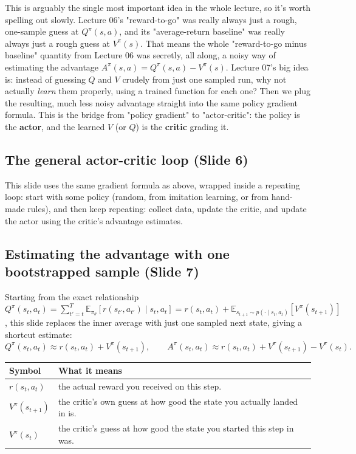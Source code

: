\documentclass[11pt]{article}
\begin{document}
This is arguably the single most important idea in the whole lecture, so it's worth spelling out slowly. Lecture 06's "reward-to-go" was really always just a rough, one-sample guess at $Q^\pi(s,a)$, and its "average-return baseline" was really always just a rough guess at $V^\pi(s)$. That means the whole "reward-to-go minus baseline" quantity from Lecture 06 was secretly, all along, a noisy way of estimating the advantage $A^\pi(s,a) = Q^\pi(s,a) - V^\pi(s)$. Lecture 07's big idea is: instead of guessing $Q$ and $V$ crudely from just one sampled run, why not actually \emph{learn} them properly, using a trained function for each one? Then we plug the resulting, much less noisy advantage straight into the same policy gradient formula. This is the bridge from "policy gradient" to "actor-critic": the policy is the \textbf{actor}, and the learned $V$ (or $Q$) is the \textbf{critic} grading it.

\subsection{The general actor-critic loop (Slide 6)}
This slide uses the same gradient formula as above, wrapped inside a repeating loop: start with some policy (random, from imitation learning, or from hand-made rules), and then keep repeating: collect data, update the critic, and update the actor using the critic's advantage estimates.

\subsection{Estimating the advantage with one bootstrapped sample (Slide 7)}
Starting from the exact relationship $Q^\pi(s_t,a_t) = \sum_{t'=t}^T \mathbb{E}_{\pi_\theta}[r(s_{t'},a_{t'})\mid s_t,a_t] = r(s_t,a_t) + \mathbb{E}_{s_{t+1}\sim p(\cdot\mid s_t,a_t)}[V^\pi(s_{t+1})]$, this slide replaces the inner average with just one sampled next state, giving a shortcut estimate:
$$Q^\pi(s_t,a_t) \approx r(s_t,a_t) + V^\pi(s_{t+1}), \qquad A^\pi(s_t,a_t) \approx r(s_t,a_t) + V^\pi(s_{t+1}) - V^\pi(s_t).$$
\begin{center}
\begin{tabular}{@{} >{\raggedright\arraybackslash}p{} >{\raggedright\arraybackslash}p{} @{}}
\toprule
\textbf{Symbol} & \textbf{What it means} \\
\midrule
$r(s_t,a_t)$ & the actual reward you received on this step. \\
$V^\pi(s_{t+1})$ & the critic's own guess at how good the state you actually landed in is. \\
$V^\pi(s_t)$ & the critic's guess at how good the state you started this step in was. \\
\bottomrule
\end{tabular}
\end{center}
\end{document}

